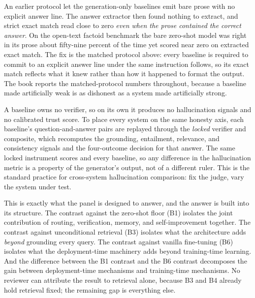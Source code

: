\begin{pitfall}
An earlier protocol let the generation-only baselines emit bare prose with no
explicit answer line. The answer extractor then found nothing to extract, and strict
exact match read close to zero \emph{even when the prose contained the correct
answer}. On the open-text factoid benchmark the bare zero-shot model was right in its
prose about fifty-nine percent of the time yet scored near zero on extracted exact
match. The fix is the matched protocol above: every baseline is required to commit to
an explicit answer line under the same instruction \caem{} follows, so its exact
match reflects what it knew rather than how it happened to format the output. The
book reports the matched-protocol numbers throughout, because a baseline made
artificially weak is as dishonest as a system made artificially strong.
\end{pitfall}

\begin{fromcode}
A baseline owns no verifier, so on its own it produces no hallucination signals and
no calibrated trust score. To place every system on the same honesty axis, each
baseline's question-and-answer pairs are replayed through the \emph{locked} \caem{}
verifier and composite, which recomputes the grounding, entailment, relevance, and
consistency signals and the four-outcome decision for that answer. The same locked
instrument scores \caem{} and every baseline, so any difference in the hallucination
metric is a property of the generator's output, not of a different ruler. This is the
standard practice for cross-system hallucination comparison: fix the judge, vary the
system under test.
\end{fromcode}

\begin{defence}
This is exactly what the panel is designed to answer, and the answer is built into
its structure. The contrast against the zero-shot floor (B1) isolates the joint
contribution of routing, verification, memory, and self-improvement together. The
contrast against unconditional retrieval (B3) isolates what the architecture adds
\emph{beyond} grounding every query. The contrast against vanilla fine-tuning (B6)
isolates what the deployment-time machinery adds beyond training-time learning. And
the difference between the B1 contrast and the B6 contrast decomposes the gain
between deployment-time mechanisms and training-time mechanisms. No reviewer can
attribute the result to retrieval alone, because B3 and B4 already hold retrieval
fixed; the remaining gap is everything else.
\end{defence}

